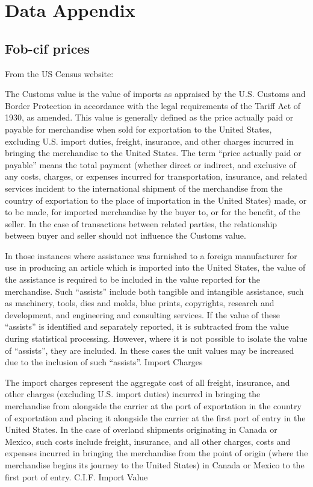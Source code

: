 \documentclass[a4paper,11pt]{article}
\begin{document}
\appendix

\section{Data Appendix \label{app:data}}

\subsection{Fob-cif prices}
From the US Census website:

The Customs value is the value of imports as appraised by the U.S. Customs and Border Protection in accordance with the legal requirements of the Tariff Act of 1930, as amended. This value is generally defined as the price actually paid or payable for merchandise when sold for exportation to the United States, excluding U.S. import duties, freight, insurance, and other charges incurred in bringing the merchandise to the United States. The term ``price actually paid or payable'' means the total payment (whether direct or indirect, and exclusive of any costs, charges, or expenses incurred for transportation, insurance, and related services incident to the international shipment of the merchandise from the country of exportation to the place of importation in the United States) made, or to be made, for imported merchandise by the buyer to, or for the benefit, of the seller. In the case of transactions between related parties, the relationship between buyer and seller should not influence the Customs value.

In those instances where assistance was furnished to a foreign manufacturer for use in producing an article which is imported into the United States, the value of the assistance is required to be included in the value reported for the merchandise. Such ``assists'' include both tangible and intangible assistance, such as machinery, tools, dies and molds, blue prints, copyrights, research and development, and engineering and consulting services. If the value of these ``assists'' is identified and separately reported, it is subtracted from the value during statistical processing. However, where it is not possible to isolate the value of ``assists'', they are included. In these cases the unit values may be increased due to the inclusion of such ``assists''.
Import Charges

The import charges represent the aggregate cost of all freight, insurance, and other charges (excluding U.S. import duties) incurred in bringing the merchandise from alongside the carrier at the port of exportation in the country of exportation and placing it alongside the carrier at the first port of entry in the United States. In the case of overland shipments originating in Canada or Mexico, such costs include freight, insurance, and all other charges, costs and expenses incurred in bringing the merchandise from the point of origin (where the merchandise begins its journey to the United States) in Canada or Mexico to the first port of entry.
C.I.F. Import Value
\end{document}
